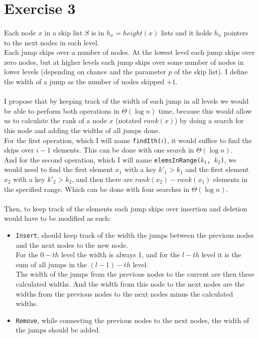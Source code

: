 \documentclass[../main.tex]{subfiles}
\begin{document}
\section{Exercise 3}
\label{sec:ex3}

\paragraph{} Each node \(x\) in a skip list \(S\) is in \(h_{x} = height(x)\) lists and it holds \(h_{x}\) pointers to the next nodes in each level. \\
Each jump skips over a number of nodes. At the lowest level each jump skips over zero nodes, but at higher levels each jump skips over some number of nodes in lower levels (depending on chance and the parameter \(p\) of the skip list). I define the width of a jump as the number of nodes skipped \(+1\).

\paragraph{} I propose that by keeping track of the width of each jump in all levels we would be able to perform both operations in \(\Theta(\log n)\) time, because this would allow us to calculate the rank of a node \(x\) (notated \(rank(x)\)) by doing a search for this node and adding the widths of all jumps done. \\
For the first operation, which I will name \texttt{findIth(\(i\))}, it would suffice to find the skips over \(i-1\) elements. This can be done with one search in \(\Theta(\log n)\). \\
And for the second operation, which I will name \texttt{elemsInRange(\(k_{1}\), \(k_{2}\))}, we would need to find the first element \(x_{1}\) with a key \(k'_{1} > k_{1}\) and the first element \(x_{2}\) with a key \(k'_{2} > k_{2}\), and then there are \(rank(x_{2}) - rank(x_{1})\) elements in the specified range. Which can be done with four searches in \(\Theta(\log n)\).

\paragraph{} Then, to keep track of the elements each jump skips over insertion and deletion would have to be modified as such:
\begin{itemize}
  \item \texttt{Insert}, should keep track of the width the jumps between the previous nodes and the next nodes to the new node. \\
    For the \(0-th\) level the width is always 1, and for the \(l-th\) level it is the sum of all jumps in the \((l-1)-th\) level. \\
    The width of the jumps from the previous nodes to the current are then these calculated widths. And the width from this node to the next nodes are the widths from the previous nodes to the next nodes minus the calculated widths.
  \item \texttt{Remove}, while connecting the previous nodes to the next nodes, the width of the jumps should be added.
\end{itemize}
\end{document}
